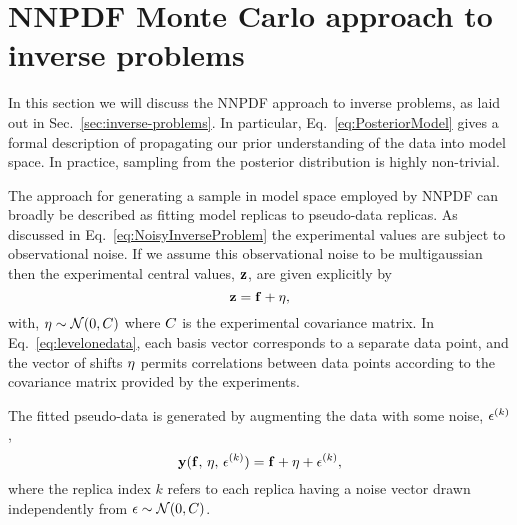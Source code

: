 \section{NNPDF Monte Carlo approach to inverse problems}
\label{sec:closure-test}

In this section we will discuss the NNPDF approach to inverse problems, as laid
out in Sec.~\ref{sec:inverse-problems}. In particular,
Eq.~\eqref{eq:PosteriorModel} gives a formal description of propagating our
prior understanding of the data into model space. In practice, sampling from the
posterior distribution is highly non-trivial.

The approach for generating a sample in model space employed by NNPDF can
broadly be described as fitting model replicas to pseudo-data replicas. As
discussed in Eq.~\eqref{eq:NoisyInverseProblem} the experimental values are
subject to observational noise. If we assume this observational noise to be
multigaussian then the experimental central values, $\mathbf{z}$, are given
explicitly by
\begin{equation}
    \label{eq:levelonedata}
    \mathbf{z} = \mathbf{f} + \mathbf{\eta},
\end{equation}
with, $\mathbf{\eta} \sim \mathcal{N}(0, C)$ where $C$ is the experimental
covariance matrix. In Eq.~\eqref{eq:levelonedata}, each basis vector corresponds
to a separate data point, and the vector of shifts $\mathbf{\eta}$ permits
correlations between data points according to the covariance matrix provided by
the experiments. 

The fitted pseudo-data is generated by augmenting the data with some
noise, $\epsilon^{(k)}$,
\begin{equation}
    \label{eq:leveltwodata1}
    \mathbf{y}(\mathbf{f},\,\mathbf{\eta},\,\mathbf{\epsilon}^{(k)})
    = \mathbf{f} + \mathbf{\eta} + \mathbf{\epsilon}^{(k)},
\end{equation}
where the replica index $k$ refers to each replica having a noise vector drawn
independently from $\mathbf{\epsilon} \sim \mathcal{N}(0, C)$.

